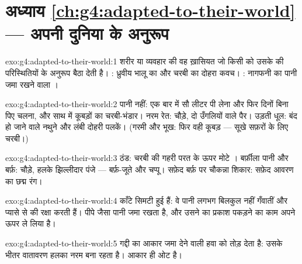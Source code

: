 \section*{अध्याय \ref{ch:g4:adapted-to-their-world} --- अपनी दुनिया के अनुरूप}

\begin{solution}{exo:g4:adapted-to-their-world:1}
शरीर या व्यवहार की वह ख़ासियत जो किसी  को उसके  की
परिस्थितियों के अनुरूप बैठा देती है। : ध्रुवीय भालू का  और चरबी
का दोहरा कवच। : नागफनी का पानी जमा रखने वाला ।
\end{solution}

\begin{solution}{exo:g4:adapted-to-their-world:2}
पानी नहीं: एक बार में सौ लीटर पी लेना और फिर दिनों बिना पिए चलना, और
साथ में कूबड़ों का चरबी-भंडार। नरम रेत: चौड़े, दो उँगलियों वाले पैर।
उड़ती धूल: बंद हो जाने वाले नथुने और लंबी दोहरी पलकें। (गरमी और भूख:
फिर वही कूबड़ --- सूखे सफ़रों के लिए चरबी।)
\end{solution}

\begin{solution}{exo:g4:adapted-to-their-world:3}
ठंड: चरबी की गहरी परत के ऊपर मोटे । बर्फ़ीला पानी और बर्फ़: चौड़े,
हलके झिल्लीदार पंजे --- बर्फ़-जूते और चप्पू। सफ़ेद बर्फ़ पर चौकन्ना
शिकार: सफ़ेद आवरण का छद्म रंग।
\end{solution}

\begin{solution}{exo:g4:adapted-to-their-world:4}
काँटे सिमटी हुई  हैं: वे पानी लगभग बिलकुल नहीं गँवातीं और
प्यासे  से  की रक्षा करती हैं। पीपे जैसा  पानी जमा रखता
है, और उसने  का प्रकाश पकड़ने का काम अपने ऊपर ले लिया है।
\end{solution}

\begin{solution}{exo:g4:adapted-to-their-world:5}
गद्दी का आकार जमा देने वाली हवा को तोड़ देता है: उसके भीतर वातावरण हलका
नरम बना रहता है। आकार ही ओट है।
\end{solution}

